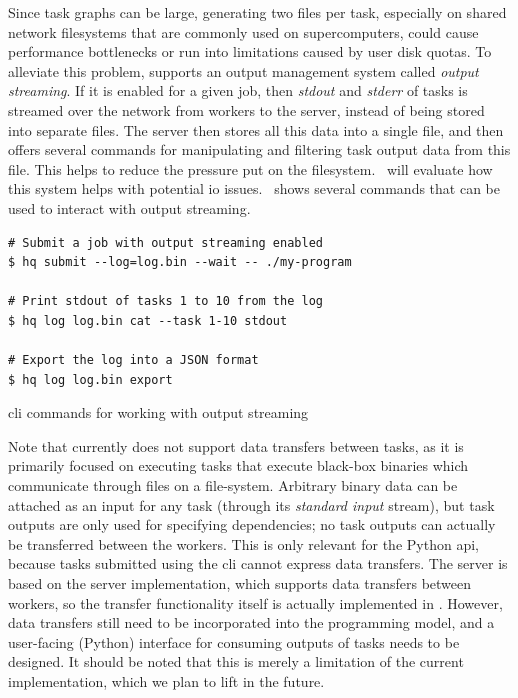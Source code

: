 Since task graphs can be large, generating two files per task, especially on shared network
filesystems that are commonly used on supercomputers, could cause performance bottlenecks or run
into limitations caused by user disk quotas. To alleviate this problem, \hq{}
supports an output management system called \emph{output streaming}. If it is enabled for a given
job, then \emph{stdout} and \emph{stderr} of tasks is streamed over the network
from workers to the server, instead of being stored into separate files. The server then stores all
this data into a single file, and then offers several commands for manipulating and filtering task
output data from this file. This helps to reduce the pressure put on the
filesystem.~ will evaluate how this system helps with potential
\gls{io} issues.~ shows several \hq{}
commands that can be used to interact with output streaming.

\begin{listing}[h]
	\begin{verbatim}
# Submit a job with output streaming enabled
$ hq submit --log=log.bin --wait -- ./my-program

# Print stdout of tasks 1 to 10 from the log
$ hq log log.bin cat --task 1-10 stdout

# Export the log into a JSON format
$ hq log log.bin export
	\end{verbatim}
	\caption{\hyperqueue{} \gls{cli} commands for working with output streaming}
	\label{lst:hq-cli-log}
\end{listing}

Note that \hyperqueue{} currently does not support data transfers between tasks, as it is
primarily focused on executing tasks that execute black-box binaries which communicate through
files on a file-system. Arbitrary binary data can be attached as an input for any task (through its
\emph{standard input} stream), but task outputs are only used for specifying dependencies; no
task outputs can actually be transferred between the workers. This is only relevant for the Python
\gls{api}, because tasks submitted using the \gls{cli} cannot express
data transfers. The \hq{} server is based on the \rsds{} server
implementation, which supports data transfers between workers, so the transfer functionality itself
is actually implemented in \hq{}. However, data transfers still need to be
incorporated into the \hyperqueue{} programming model, and a user-facing (Python)
interface for consuming outputs of tasks needs to be designed. It should be noted that this is
merely a limitation of the current implementation, which we plan to lift in the future.


